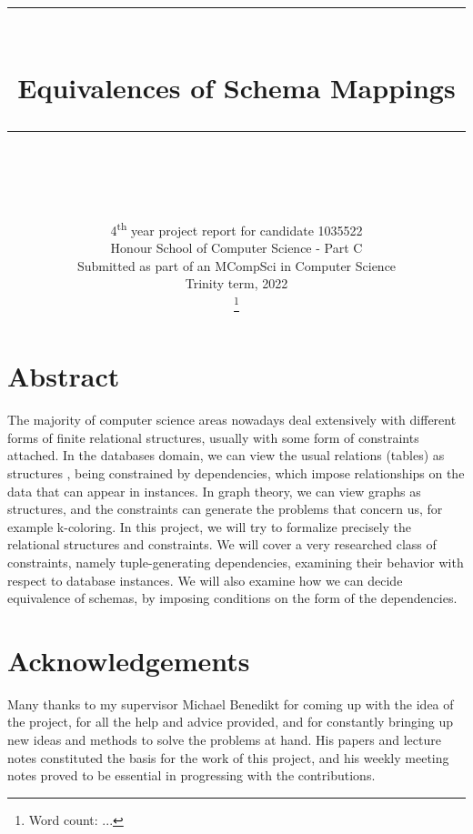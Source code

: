 \documentclass[11pt, a4paper, dvipsnames]{article}
\newcommand\blankpage{
    \null
    \thispagestyle{empty}%
    \addtocounter{page}{-1}%
    \newpage}
\newcommand{\HRule}[1]{\rule{\linewidth}{#1}}
\begin{document}
\title{ \normalsize \textsc{}
		\\ [2.0cm]
		\HRule{0.5pt} \\
		\LARGE \textbf{Equivalences of Schema Mappings}
		\HRule{0.5pt} \\ [0.5cm]
		\normalsize  \vspace*{3\baselineskip}}
\date{}
\author{
		4\textsuperscript{th} year project report for candidate 1035522\\
        Honour School of Computer Science - Part C\\
        Submitted as part of an MCompSci in Computer Science\\
		Trinity term, 2022\\ \footnote{Word count: ...}	
		}

\maketitle
\thispagestyle{empty}
\newpage
\blankpage

\setcounter{page}{3}

\justifying

\section{Abstract}
The majority of computer science areas nowadays deal extensively with different forms of finite relational structures, usually with some form of constraints attached. In the databases domain, we can view the usual relations (tables) as structures , being constrained by dependencies, which impose relationships on the data that can appear in instances. In graph theory, we can view graphs as structures, and the constraints can generate the problems that concern us, for example k-coloring. In this project, we will try to formalize precisely the relational structures and constraints. We will cover a very researched class of constraints, namely tuple-generating dependencies, examining their behavior with respect to database instances. We will also examine how we can decide equivalence of schemas, by imposing conditions on the form of the dependencies.

\section{Acknowledgements}
Many thanks to my supervisor Michael Benedikt for coming up with the idea of the project, for all the help and advice provided, and for constantly bringing up new ideas and methods to solve the problems at hand. His papers and lecture notes constituted the basis for the work of this project, and his weekly meeting notes proved to be essential in progressing with the contributions.
\end{document}
